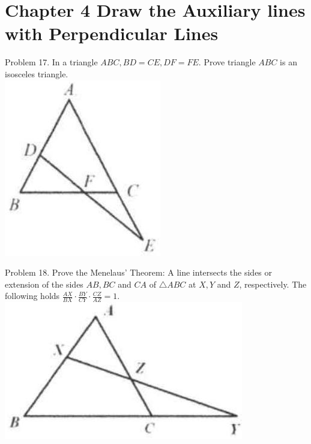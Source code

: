 \documentclass[10pt]{article}
\begin{document}
\section*{Chapter 4 Draw the Auxiliary lines with Perpendicular Lines}
Problem 17. In a triangle \(A B C, B D=C E, D F=F E\). Prove triangle \(A B C\) is an isosceles triangle.\\
\includegraphics[max width=\textwidth, center]{2025_04_17_97bc1f7e44d93c271a88g-091(1)}

Problem 18. Prove the Menelaus' Theorem: A line intersects the sides or extension of the sides \(A B, B C\) and \(C A\) of \(\triangle A B C\) at \(X, Y\) and \(Z\), respectively. The following holds \(\frac{A X}{B X} \cdot \frac{B Y}{C Y} \cdot \frac{C Z}{A Z}=1\).\\
\includegraphics[max width=\textwidth, center]{2025_04_17_97bc1f7e44d93c271a88g-091}
\end{document}
